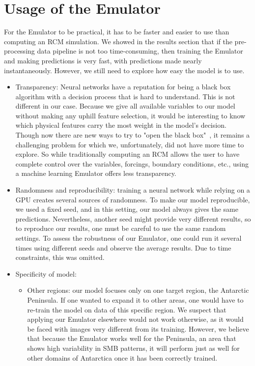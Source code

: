 \documentclass[a4paper,11pt,oneside]{report}
\begin{document}
\section{Usage of the Emulator}\label{sec:utility-emulators}
For the Emulator to be practical, it has to be faster and easier to use than computing an RCM simulation. We showed in the results section that if the pre-processing data pipeline is not too time-consuming, then training the Emulator and making predictions is very fast, with predictions made nearly instantaneously. However, we still need to explore how easy the model is to use.  
\begin{itemize}
    \item Transparency: Neural networks have a reputation for being a black box algorithm with a decision process that is hard to understand. This is not different in our case. Because we give all available variables to our model without making any uphill feature selection, it would be interesting to know which physical features carry the most weight in the model's decision. Though now there are new ways to try to "open the black box"~\cite{Guidotti, Doury}, it remains a challenging problem for which we, unfortunately, did not have more time to explore. So while traditionally computing an RCM allows the user to have complete control over the variables, forcings, boundary conditions, etc., using a machine learning Emulator offers less transparency.  
    \item Randomness and reproducibility: training a neural network while relying on a GPU creates several sources of randomness. To make our model reproducible, we used a fixed seed, and in this setting, our model always gives the same predictions. Nevertheless, another seed might provide very different results, so to reproduce our results, one must be careful to use the same random settings. To assess the robustness of our Emulator, one could run it several times using different seeds and observe the average results. Due to time constraints, this was omitted. 
    \item Specificity of model: 
    \begin{itemize}
        \item Other regions: our model focuses only on one target region, the Antarctic Peninsula. If one wanted to expand it to other areas, one would have to re-train the model on data of this specific region. We suspect that applying our Emulator elsewhere would not work otherwise, as it would be faced with images very different from its training. However, we believe that because the Emulator works well for the Peninsula, an area that shows high variability in SMB patterns, it will perform just as well for other domains of Antarctica once it has been correctly trained. 

\end{itemize}
\end{itemize}
\end{document}
